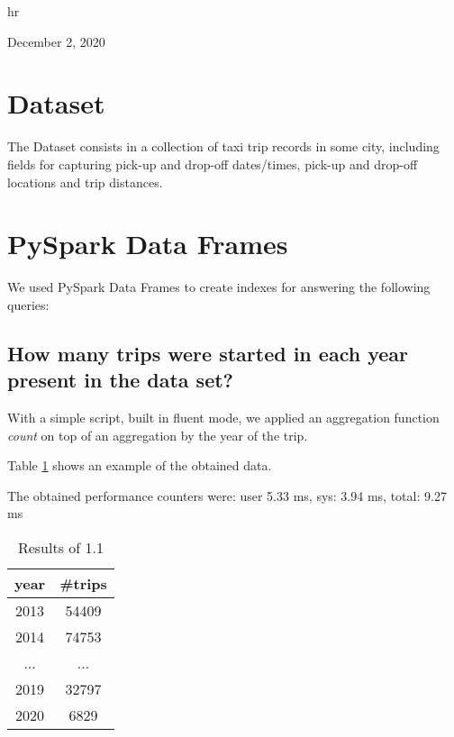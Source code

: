 \documentclass[conference,compsoc]{IEEEtran}
\begin{document}
\hfill hr

\hfill December 2, 2020




\section{Dataset}
The Dataset consists in a collection of taxi trip records in some city, including fields for capturing pick-up and drop-off dates/times, pick-up and drop-off locations and trip distances.

\section{PySpark Data Frames}
We used PySpark Data Frames to create indexes for answering the following queries:
\subsection{How many trips were started in each year present in the data set?}
With a simple script, built in fluent mode, we applied an aggregation function \textit{count} on top of an aggregation by the year of the trip.
\par
Table \ref{output_1_1} shows an example of the obtained data. \par
The obtained performance counters were: user 5.33 ms, sys: 3.94 ms, total: 9.27 ms

\begin{table}[!t]
\renewcommand{\arraystretch}{1.3}
\caption{Results of 1.1}
\label{output_1_1}
\centering
\begin{tabular}{c||c}
\hline
\bfseries year & \bfseries \#trips\\
\hline\hline
2013 & 54409\\
2014 & 74753\\
... & ...\\
2019 & 32797\\
2020 & 6829 \\
\hline
\end{tabular}
\end{table}
\end{document}
